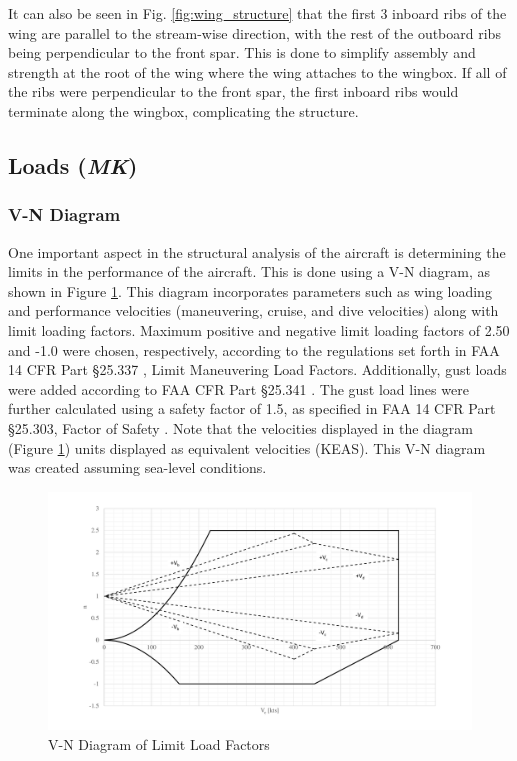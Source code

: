 It can also be seen in Fig. \ref{fig:wing_structure} that the first 3 inboard ribs of the wing are parallel to the stream-wise direction, with the rest of the outboard ribs being perpendicular to the front spar. This is done to simplify assembly and strength at the root of the wing where the wing attaches to the wingbox. If all of the ribs were perpendicular to the front spar, the first inboard ribs would terminate along the wingbox, complicating the structure.
\clearpage

\subsection{Loads (\textit{MK})}
\subsubsection{V-N Diagram}
\label{subvn}
One important aspect in the structural analysis of the aircraft is determining the limits in the performance of the aircraft. This is done using a V-N diagram, as shown in Figure \ref{figVN}. This diagram incorporates parameters such as wing loading and performance velocities (maneuvering, cruise, and dive velocities) along with limit loading factors. Maximum positive and negative limit loading factors of 2.50 and -1.0 were chosen, respectively, according to the regulations set forth in FAA 14 CFR Part \S 25.337 \cite{cfr}, Limit Maneuvering Load Factors. Additionally, gust loads were added according to FAA CFR Part \S 25.341 \cite{cfr}. The gust load lines were further calculated using a safety factor of 1.5, as specified in FAA 14 CFR Part \S 25.303, Factor of Safety \cite{cfr}. Note that the velocities displayed in the diagram (Figure \ref{figVN}) units displayed as equivalent velocities (KEAS). This V-N diagram was created assuming sea-level conditions. 

\begin{figure}[H]
    \centering
    \includegraphics[width=\linewidth]{Photos/VN_Diagram.pdf}
    \caption{V-N Diagram of Limit Load Factors}
    \label{figVN}
\end{figure}

